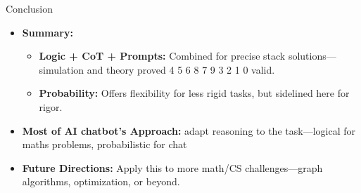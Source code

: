 \begin{frame}{Conclusion}
    \begin{itemize}
        \item \textbf{Summary:}
        \begin{itemize}
            \item \textbf{Logic + CoT + Prompts:} Combined for precise stack solutions—simulation and theory proved 4 5 6 8 7 9 3 2 1 0 valid.
            \item \textbf{Probability:} Offers flexibility for less rigid tasks, but sidelined here for rigor.
        \end{itemize}
        \item \textbf{Most of AI chatbot's Approach:}  adapt reasoning to the task—logical for maths problems, probabilistic for chat
        \item \textbf{Future Directions:} Apply this to more math/CS challenges—graph algorithms, optimization, or beyond.
    \end{itemize}
\end{frame}

